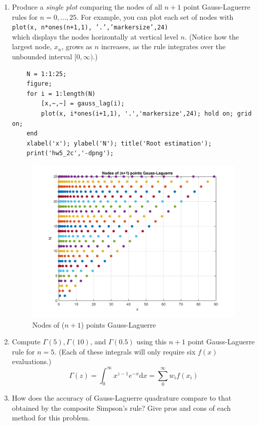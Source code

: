 \documentclass[14pt,a4paper]{article}
\begin{document}
\begin{enumerate}
			
	\label{2c}
	\item Produce a \textit{single plot} comparing the nodes of all $n+1$ point Gauss-Laguerre rules for $n=0,...,25$. For example, you can plot each set of nodes with\\
	\hspace*{5cm} \texttt{plot(x, n*ones(n+1,1), '.','markersize',24)}\\
	which displays the nodes horizontally at vertical level $n$. (Notice how the largest node, $x_n$, grows as $n$ increases, as the rule integrates over the unbounded interval $[0, \infty)$.)
	\begin{lstlisting}
	N = 1:1:25;
	figure;
	for i = 1:length(N)
		[x,~,~] = gauss_lag(i);
		plot(x, i*ones(i+1,1), '.','markersize',24); hold on; grid on;
	end
	xlabel('x'); ylabel('N'); title('Root estimation');
	print('hw5_2c','-dpng');
	\end{lstlisting}
	\begin{figure}[htp]
		\centering
		\includegraphics[scale=0.6]{hw5_2c.png}
		\caption{Nodes of ($n+1$) points Gauss-Laguerre}
	\end{figure}
	
	
	\label{2d}
	\item Compute $\Gamma(5), \Gamma(10)$, and $\Gamma(0.5)$ using this $n+1$ point Gauss-Laguerre rule for $n=5$. (Each of these integrals will only require six $ f(x)$ evaluations.)
	$$\Gamma(z) = \int_{0}^{\infty}x^{z-1}e^{-x}\mathrm{d}x = \sum_{0}^{\infty}w_if(x_i)$$
	
	\label{2e} 
	\item How does the accuracy of Gauss-Laguerre quadrature compare to that obtained by the composite Simpson's rule? Give pros and cons of each method for this problem.
	
	 
\end{enumerate}
\end{document}
